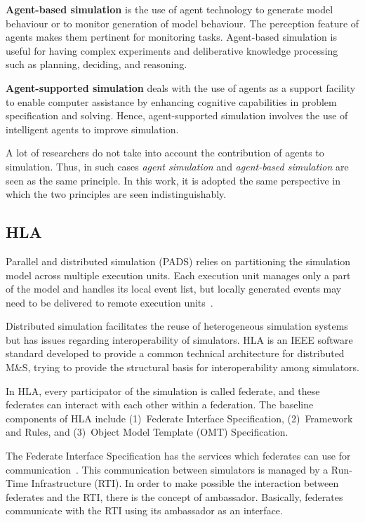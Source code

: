\documentclass[conference]{IEEEtran}
\begin{document}
\begin{compactitem}
  \item \textbf{Agent-based simulation} is the use of agent technology to generate model behaviour or to monitor generation of model behaviour. The perception feature of agents makes them pertinent for monitoring tasks. Agent-based simulation is useful for having complex experiments and deliberative knowledge processing such as planning, deciding, and reasoning.
  \item \textbf{Agent-supported simulation} deals with the use of agents as a support facility to enable computer assistance by enhancing cognitive capabilities in problem specification and solving. Hence, agent-supported simulation involves the use of intelligent agents to improve simulation.
\end{compactitem}

A lot of researchers do not take into account the contribution of agents to simulation. Thus, in such cases \textit{agent simulation} and \textit{agent-based simulation} are seen as the same principle. In this work, it is adopted the same perspective in which the two principles are seen indistinguishably. 

\subsection{HLA}

Parallel and distributed simulation (PADS) relies on partitioning the simulation model across multiple execution units. Each execution unit manages only a part of the model and handles its local event list, but locally generated events may need to be delivered to remote execution units~\cite{DAngelo2014320}.

Distributed simulation facilitates the reuse of heterogeneous simulation systems but has issues regarding interoperability of simulators. HLA is an IEEE software standard developed to provide a common technical architecture for distributed M\&S, trying to provide the structural basis for interoperability among simulators.

In HLA, every participator of the simulation is called federate, and these federates can interact with each other within a federation. The baseline components of HLA include (1)~Federate Interface Specification, (2)~Framework and Rules, and (3)~Object Model Template (OMT) Specification.

The Federate Interface Specification has the services which federates can use for communication~\cite{ieee2010hlaFederate}. This communication between simulators is managed by a Run-Time Infrastructure (RTI). In order to make possible the interaction between federates and the RTI, there is the concept of ambassador. Basically, federates communicate with the RTI using its ambassador as an interface.
\end{document}
